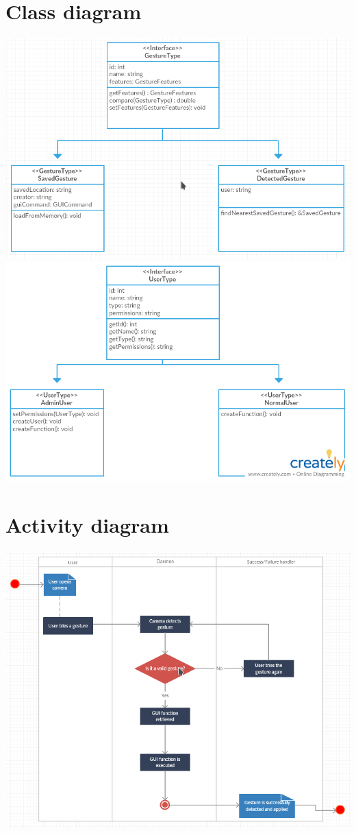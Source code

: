 \documentclass{scrreprt}
\begin{document}
\section{Class diagram}
\begin{center}
    \includegraphics[scale=0.8]{classdiagram.png}
    \includegraphics[scale=0.8]{UserClass.png}
\end{center}
\section{Activity diagram}
\begin{center}
    \includegraphics[scale=0.8]{activitydiagram.png}
\end{center}
\end{document}
